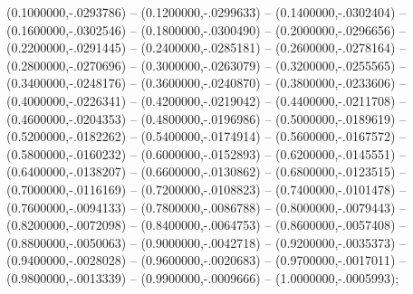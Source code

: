 (0.1000000,-.0293786) -- 
(0.1200000,-.0299633) -- 
(0.1400000,-.0302404) -- 
(0.1600000,-.0302546) -- 
(0.1800000,-.0300490) -- 
(0.2000000,-.0296656) -- 
(0.2200000,-.0291445) -- 
(0.2400000,-.0285181) -- 
(0.2600000,-.0278164) -- 
(0.2800000,-.0270696) -- 
(0.3000000,-.0263079) -- 
(0.3200000,-.0255565) -- 
(0.3400000,-.0248176) -- 
(0.3600000,-.0240870) -- 
(0.3800000,-.0233606) -- 
(0.4000000,-.0226341) -- 
(0.4200000,-.0219042) -- 
(0.4400000,-.0211708) -- 
(0.4600000,-.0204353) -- 
(0.4800000,-.0196986) -- 
(0.5000000,-.0189619) -- 
(0.5200000,-.0182262) -- 
(0.5400000,-.0174914) -- 
(0.5600000,-.0167572) -- 
(0.5800000,-.0160232) -- 
(0.6000000,-.0152893) -- 
(0.6200000,-.0145551) -- 
(0.6400000,-.0138207) -- 
(0.6600000,-.0130862) -- 
(0.6800000,-.0123515) -- 
(0.7000000,-.0116169) -- 
(0.7200000,-.0108823) -- 
(0.7400000,-.0101478) -- 
(0.7600000,-.0094133) -- 
(0.7800000,-.0086788) -- 
(0.8000000,-.0079443) -- 
(0.8200000,-.0072098) -- 
(0.8400000,-.0064753) -- 
(0.8600000,-.0057408) -- 
(0.8800000,-.0050063) -- 
(0.9000000,-.0042718) -- 
(0.9200000,-.0035373) -- 
(0.9400000,-.0028028) -- 
(0.9600000,-.0020683) -- 
(0.9700000,-.0017011) -- 
(0.9800000,-.0013339) -- 
(0.9900000,-.0009666) -- 
(1.0000000,-.0005993);
